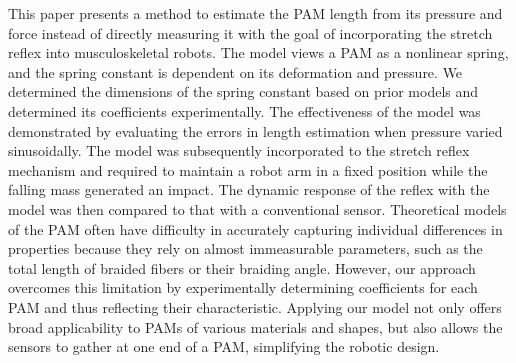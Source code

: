 This paper presents a method to estimate the PAM length from its pressure and force instead of directly measuring it with the goal of incorporating the stretch reflex into musculoskeletal robots.
The model views a PAM as a nonlinear spring, and the spring constant is dependent on its deformation and pressure. 
We determined the dimensions of the spring constant based on prior models and determined its coefficients experimentally.
The effectiveness of the model was demonstrated by evaluating the errors in length estimation when pressure varied sinusoidally.
The model was subsequently incorporated to the stretch reflex mechanism and required to maintain a robot arm in a fixed position while the falling mass generated an impact.
The dynamic response of the reflex with the model was then compared to that with a conventional sensor. 
Theoretical models of the PAM often have difficulty in accurately capturing individual differences in properties because they rely on almost immeasurable parameters, such as the total length of braided fibers or their braiding angle\cite{motion}. However, our approach overcomes this limitation by experimentally determining coefficients for each PAM and thus reflecting their characteristic. Applying our model not only offers broad applicability to PAMs of various materials and shapes, but also allows the sensors to gather at one end of a PAM, simplifying the robotic design. 